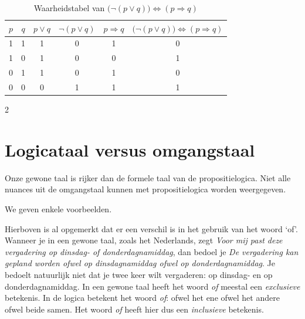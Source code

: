 \begin{table}[h]
\begin{center}
\begin{tabular}{c|c|c|c|c|c}  
$p$ & $q$ & $p\lor q$ & $\lnot (p\lor q)$ & $p \Rightarrow q$ & $\big( \lnot (p \lor q) \big) \Leftrightarrow (p \Rightarrow q)$\\
\hline
1 & 1 & 1 & 0 & 1 & 0\\
1 & 0 & 1 & 0 & 0 & 1\\
0 & 1 & 1 & 0 & 1 & 0\\
0 & 0 & 0 & 1 & 1 & 1
\end{tabular}
\caption{Waarheidstabel van $\big( \lnot (p \lor q) \big) \Leftrightarrow (p \Rightarrow q)$} \label{prop2}
\end{center}
\end{table}
\begin{multicols}{2}




\section{Logicataal versus omgangstaal}




Onze gewone taal is rijker dan de formele taal van de propositielogica. Niet alle nuances uit de omgangstaal kunnen met propositielogica worden weergegeven. 

We geven enkele voorbeelden.

Hierboven is al opgemerkt dat er een verschil is in het gebruik van het woord `of'. Wanneer je in een gewone taal, zoals het Nederlands, zegt \textsl{Voor mij past deze vergadering op dinsdag- of donderdagnamiddag}, dan bedoel je \textsl{De vergadering kan gepland worden ofwel op dinsdagnamiddag ofwel op donderdagnamiddag}. Je bedoelt natuurlijk niet dat je twee keer wilt vergaderen: op dinsdag- en op donderdagnamiddag. In een gewone taal heeft het woord \textsl{of} meestal een \emph{exclusieve} betekenis. In de logica betekent het woord \textsl{of}: ofwel het ene ofwel het andere ofwel beide samen. Het woord \textsl{of} heeft hier dus een \emph{inclusieve} betekenis.


\end{multicols}
